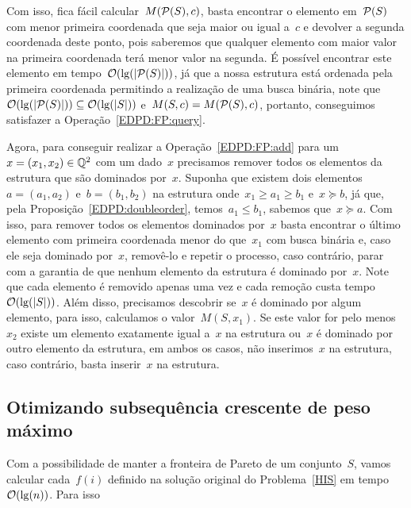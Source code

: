 Com isso, fica fácil calcular~$M(\mathcal{P}(S),c)$, basta encontrar o elemento em~$\mathcal{P}(S)$ com menor primeira coordenada que seja maior ou igual a~$c$ e devolver a segunda coordenada deste ponto, pois saberemos que qualquer elemento com maior valor na primeira coordenada terá menor valor na segunda. É possível encontrar este elemento em tempo~$\mathcal{O}(\lg(|\mathcal{P}(S)|))$, já que a nossa estrutura está ordenada pela primeira coordenada permitindo a realização de uma busca binária, note que~${\mathcal{O}(\lg(|\mathcal{P}(S)|)) \subseteq \mathcal{O}(\lg(|S|))}$ e~$M(S,c) = M(\mathcal{P}(S),c)$, portanto, conseguimos satisfazer a Operação~\ref{EDPD:FP:query}.

Agora, para conseguir realizar a Operação~\ref{EDPD:FP:add} para um~$x = (x_1,x_2) \in \mathbb{Q}^2$ com um dado~$x$ precisamos remover todos os elementos da estrutura que são dominados por~$x$. Suponha que existem dois elementos~$a = (a_1,a_2)$ e~$b = (b_1,b_2)$ na estrutura onde~$x_1 \geq a_1 \geq b_1$ e~$x \succeq b$, já que, pela Proposição~\ref{EDPD:doubleorder}, temos~$a_1 \leq b_1$, sabemos que~$x \succeq a$. Com isso, para remover todos os elementos dominados por~$x$ basta encontrar o último elemento com primeira coordenada menor do que~$x_1$ com busca binária e, caso ele seja dominado por~$x$, removê-lo e repetir o processo, caso contrário, parar com a garantia de que nenhum elemento da estrutura é dominado por~$x$. Note que cada elemento é removido apenas uma vez e cada remoção custa tempo~$\mathcal{O}(\lg(|S|))$. Além disso, precisamos descobrir se~$x$ é dominado por algum elemento, para isso, calculamos o valor~$M(S,x_1)$. Se este valor for pelo menos~$x_2$ existe um elemento exatamente igual a~$x$ na estrutura ou~$x$ é dominado por outro elemento da estrutura, em ambos os casos, não inserimos~$x$ na estrutura, caso contrário, basta inserir~$x$ na estrutura.


\subsection{Otimizando subsequência crescente de peso máximo}

Com a possibilidade de manter a fronteira de Pareto de um conjunto~$S$, vamos calcular cada~$f(i)$ definido na solução original do Problema~\ref{HIS} em tempo~$\mathcal{O}(\lg(n))$. Para isso
